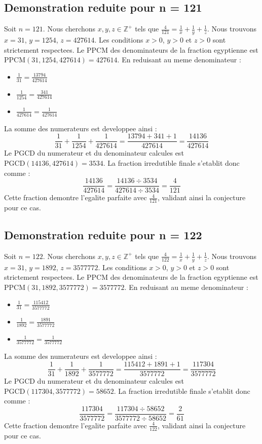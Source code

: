 \documentclass[11pt,a4paper]{article}
\begin{document}
\subsection{Demonstration reduite pour n = 121}
Soit $n = 121$. Nous cherchons $x, y, z \in \mathbb{Z}^{+}$ tels que $\frac{4}{121} = \frac{1}{x} + \frac{1}{y} + \frac{1}{z}$.
Nous trouvons $x = 31$, $y = 1254$, $z = 427614$.
Les conditions $x > 0$, $y > 0$ et $z > 0$ sont strictement respectees.
Le PPCM des denominateurs de la fraction egyptienne est $\text{PPCM}(31, 1254, 427614) = 427614$.
En reduisant au meme denominateur :
\begin{itemize}
    \item $\frac{1}{31} = \frac{13794}{427614}$
    \item $\frac{1}{1254} = \frac{341}{427614}$
    \item $\frac{1}{427614} = \frac{1}{427614}$
\end{itemize}
La somme des numerateurs est developpee ainsi :
$$ \frac{1}{31} + \frac{1}{1254} + \frac{1}{427614} = \frac{13794 + 341 + 1}{427614} = \frac{14136}{427614} $$
Le PGCD du numerateur et du denominateur calcules est $\text{PGCD}(14136, 427614) = 3534$.
La fraction irredutible finale s'etablit donc comme :
$$ \frac{14136}{427614} = \frac{14136 \div 3534}{427614 \div 3534} = \frac{4}{121} $$
Cette fraction demontre l'egalite parfaite avec $\frac{4}{121}$, validant ainsi la conjecture pour ce cas.

\subsection{Demonstration reduite pour n = 122}
Soit $n = 122$. Nous cherchons $x, y, z \in \mathbb{Z}^{+}$ tels que $\frac{4}{122} = \frac{1}{x} + \frac{1}{y} + \frac{1}{z}$.
Nous trouvons $x = 31$, $y = 1892$, $z = 3577772$.
Les conditions $x > 0$, $y > 0$ et $z > 0$ sont strictement respectees.
Le PPCM des denominateurs de la fraction egyptienne est $\text{PPCM}(31, 1892, 3577772) = 3577772$.
En reduisant au meme denominateur :
\begin{itemize}
    \item $\frac{1}{31} = \frac{115412}{3577772}$
    \item $\frac{1}{1892} = \frac{1891}{3577772}$
    \item $\frac{1}{3577772} = \frac{1}{3577772}$
\end{itemize}
La somme des numerateurs est developpee ainsi :
$$ \frac{1}{31} + \frac{1}{1892} + \frac{1}{3577772} = \frac{115412 + 1891 + 1}{3577772} = \frac{117304}{3577772} $$
Le PGCD du numerateur et du denominateur calcules est $\text{PGCD}(117304, 3577772) = 58652$.
La fraction irredutible finale s'etablit donc comme :
$$ \frac{117304}{3577772} = \frac{117304 \div 58652}{3577772 \div 58652} = \frac{2}{61} $$
Cette fraction demontre l'egalite parfaite avec $\frac{4}{122}$, validant ainsi la conjecture pour ce cas.
\end{document}
